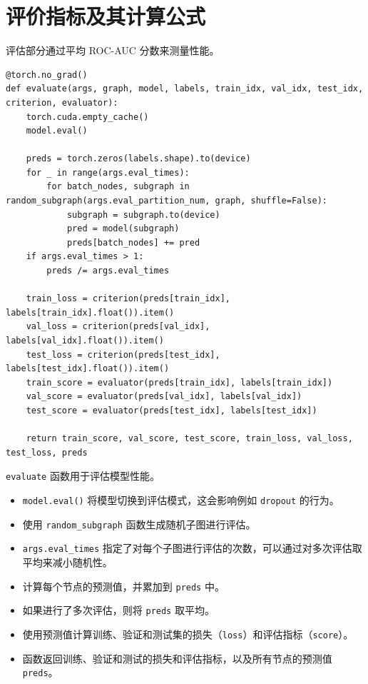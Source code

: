 \documentclass{article}
\begin{document}
\section*{评价指标及其计算公式}
评估部分通过平均 ROC-AUC 分数来测量性能。
\begin{verbatim}
@torch.no_grad()
def evaluate(args, graph, model, labels, train_idx, val_idx, test_idx, criterion, evaluator):
    torch.cuda.empty_cache()
    model.eval()

    preds = torch.zeros(labels.shape).to(device)
    for _ in range(args.eval_times):
        for batch_nodes, subgraph in random_subgraph(args.eval_partition_num, graph, shuffle=False):
            subgraph = subgraph.to(device)
            pred = model(subgraph)
            preds[batch_nodes] += pred
    if args.eval_times > 1:
        preds /= args.eval_times

    train_loss = criterion(preds[train_idx], labels[train_idx].float()).item()
    val_loss = criterion(preds[val_idx], labels[val_idx].float()).item()
    test_loss = criterion(preds[test_idx], labels[test_idx].float()).item()
    train_score = evaluator(preds[train_idx], labels[train_idx])
    val_score = evaluator(preds[val_idx], labels[val_idx])
    test_score = evaluator(preds[test_idx], labels[test_idx])

    return train_score, val_score, test_score, train_loss, val_loss, test_loss, preds
\end{verbatim}
\texttt{evaluate} 函数用于评估模型性能。
\begin{itemize}
    \item \texttt{model.eval()} 将模型切换到评估模式，这会影响例如 \texttt{dropout} 的行为。
    \item 使用 \texttt{random\_subgraph} 函数生成随机子图进行评估。
    \item \texttt{args.eval\_times} 指定了对每个子图进行评估的次数，可以通过对多次评估取平均来减小随机性。
    \item 计算每个节点的预测值，并累加到 \texttt{preds} 中。
    \item 如果进行了多次评估，则将 \texttt{preds} 取平均。
    \item 使用预测值计算训练、验证和测试集的损失（\texttt{loss}）和评估指标（\texttt{score}）。
    \item 函数返回训练、验证和测试的损失和评估指标，以及所有节点的预测值 \texttt{preds}。
\end{itemize}
\end{document}
